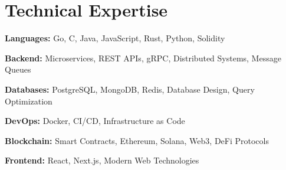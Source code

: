 
\section{Technical Expertise}

\begin{itemize}[leftmargin=0.15in, label={}]

\small{
\item{\textbf{Languages:} Go, C, Java, JavaScript, Rust, Python, Solidity}
\item{\textbf{Backend:} Microservices, REST APIs, gRPC, Distributed Systems, Message Queues}
\item{\textbf{Databases:} PostgreSQL, MongoDB, Redis, Database Design, Query Optimization}
\item{\textbf{DevOps:} Docker, CI/CD, Infrastructure as Code}
\item{\textbf{Blockchain:} Smart Contracts, Ethereum, Solana, Web3, DeFi Protocols}
\item{\textbf{Frontend:} React, Next.js, Modern Web Technologies}
}

\end{itemize}
